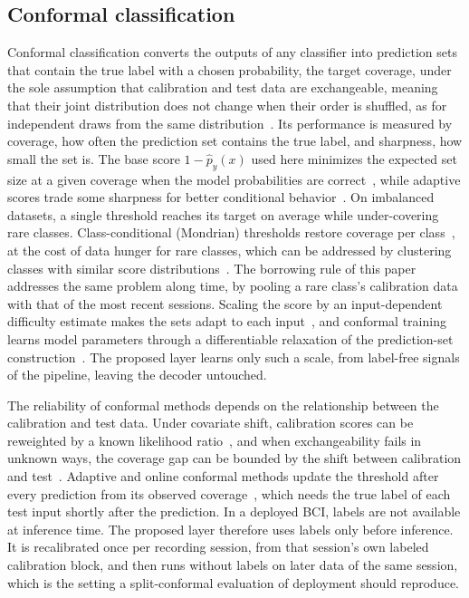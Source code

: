 \documentclass{article}
\begin{document}
\subsection{Conformal classification}
Conformal classification converts the outputs of any classifier into prediction sets that contain the true label with a chosen probability, the target coverage, under the sole assumption that calibration and test data are exchangeable, meaning that their joint distribution does not change when their order is shuffled, as for independent draws from the same distribution~\cite{angelopoulos2022a}. Its performance is measured by coverage, how often the prediction set contains the true label, and sharpness, how small the set is. The base score $1-\hat p_y(x)$ used here minimizes the expected set size at a given coverage when the model probabilities are correct~\cite{sadinle2019}, while adaptive scores trade some sharpness for better conditional behavior~\cite{romano2020}. On imbalanced datasets, a single threshold reaches its target on average while under-covering rare classes. Class-conditional (Mondrian) thresholds restore coverage per class~\cite{vovk2012,sadinle2019}, at the cost of data hunger for rare classes, which can be addressed by clustering classes with similar score distributions~\cite{ding2023}. The borrowing rule of this paper addresses the same problem along time, by pooling a rare class's calibration data with that of the most recent sessions. Scaling the score by an input-dependent difficulty estimate makes the sets adapt to each input~\cite{lei2018}, and conformal training learns model parameters through a differentiable relaxation of the prediction-set construction~\cite{stutz2022}. The proposed layer learns only such a scale, from label-free signals of the pipeline, leaving the decoder untouched.

The reliability of conformal methods depends on the relationship between the calibration and test data. Under covariate shift, calibration scores can be reweighted by a known likelihood ratio~\cite{tibshirani2019}, and when exchangeability fails in unknown ways, the coverage gap can be bounded by the shift between calibration and test~\cite{barber2023}. Adaptive and online conformal methods update the threshold after every prediction from its observed coverage~\cite{gibbs2021,zaffran2022,bhatnagar2023}, which needs the true label of each test input shortly after the prediction. In a deployed BCI, labels are not available at inference time. The proposed layer therefore uses labels only before inference. It is recalibrated once per recording session, from that session's own labeled calibration block, and then runs without labels on later data of the same session, which is the setting a split-conformal evaluation of deployment should reproduce.
\end{document}
